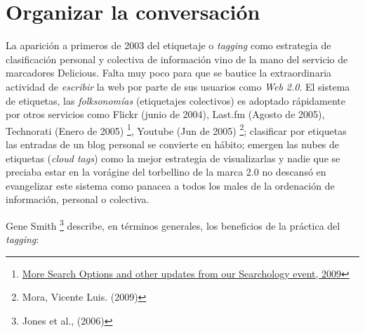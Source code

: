 \documentclass[12pt, a4paper,twoside]{book}
\begin{document}
\section{Organizar la conversación}

La aparición a primeros de 2003 del etiquetaje o \emph{tagging}
como estrategia de clasificación personal y colectiva de
información vino de la mano del servicio de marcadores Delicious.
Falta muy poco para que se bautice la extraordinaria actividad de
\emph{escribir} la web por parte de sus usuarios como
\emph{Web 2.0}. El sistema de etiquetas, las \emph{folksonomías}
(etiquetajes colectivos) es adoptado rápidamente por otros
servicios como Flickr (junio de 2004), Last.fm (Agosto de 2005),
Technorati (Enero de 2005)%
\footnote{\href{http://googleblog.blogspot.com/2009/05/more-search-options-and-other-updates.html}{More Search Options and other updates from our Searchology event, 2009}},
Youtube (Jun de 2005)%
\footnote{Mora, Vicente Luis. (2009)};
clasificar por etiquetas las entradas de un blog personal se
convierte en hábito; emergen las nubes de etiquetas
(\emph{cloud tags}) como la mejor estrategia de visualizarlas y
nadie que se preciaba estar en la vorágine del torbellino de la
marca 2.0 no descansó en evangelizar este sistema como panacea a
todos los males de la ordenación de información, personal o
colectiva.

Gene Smith%
\footnote{Jones et al., (2006)}
describe, en términos generales, los beneficios de la práctica del
\emph{tagging}:
\end{document}
